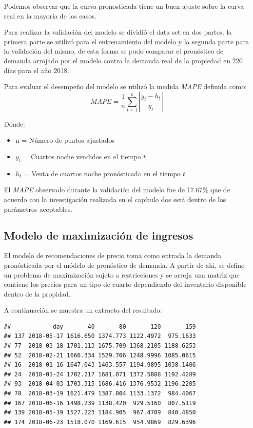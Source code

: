 Podemos observar que la curva pronosticada tiene un buen ajuste sobre la curva real en la mayoría de los casos.

Para realizar la validación del modelo se dividió el data set en dos partes, la primera parte se utilizó para el entrenamiento del modelo y la segunda parte para la validación del mismo, de esta forma se pudo comparar el pronóstico de demanda arrojado por el modelo contra la demanda real de la propiedad en 220 días para el año 2018.

Para evaluar el desempeño del modelo se utilizó la medida \emph{MAPE} definida como: $$MAPE=\frac{1}{n}\sum_{t=1}^{n}|\frac{y_t-h_t}{y_t}|$$

Dónde:
\begin{itemize}[noitemsep]
  \item n = Número de puntos ajustados
  \item $y_t$ = Cuartos noche vendidos en el tiempo $t$
  \item $h_t$ = Venta de cuartos noche pronósticada en el tiempo $t$
\end{itemize}


El \emph{MAPE} observado durante la validación del modelo fue de 17.67\% que de acuerdo con la investigación realizada en el capítulo dos está dentro de los parámetros aceptables.


\subsection*{Modelo de maximización de ingresos}

El modelo de recomendaciones de precio toma como entrada la demanda pronósticada por el módelo de pronóstico de demanda. A partir de ahi, se define un problema de maximización sujeto a restricciones y se arroja una matriz que contiene los precios para un tipo de cuarto dependiendo del inventario disponible dentro de la propidad.

A continuación se muestra un extracto del resultado:

\begin{verbatim}
##            day       40       80       120       159
## 137 2018-05-17 1616.650 1374.773 1122.4972  975.1633
## 77  2018-03-18 1701.113 1675.709 1368.2105 1188.6253
## 52  2018-02-21 1666.334 1529.706 1248.9996 1085.0615
## 16  2018-01-16 1647.043 1463.557 1194.9895 1038.1406
## 24  2018-01-24 1702.217 1681.071 1372.5888 1192.4289
## 93  2018-04-03 1703.315 1686.416 1376.9532 1196.2205
## 78  2018-03-19 1621.479 1387.804 1133.1372  984.4067
## 167 2018-06-16 1498.239 1138.420  929.5160  807.5119
## 139 2018-05-19 1527.223 1184.905  967.4709  840.4850
## 174 2018-06-23 1518.070 1169.615  954.9869  829.6396
\end{verbatim}

